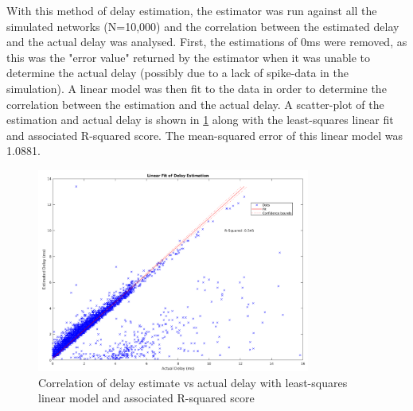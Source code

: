 With this method of delay estimation, the estimator was run against all the simulated networks (N=10,000) and the correlation between the estimated delay and the actual delay was analysed. First, the estimations of 0ms were removed, as this was the "error value" returned by the estimator when it was unable to determine the actual delay (possibly due to a lack of spike-data in the simulation). A linear model was then fit to the data in order to determine the correlation between the estimation and the actual delay. A scatter-plot of the estimation and actual delay is shown in \ref{fig:2CellDelayLFit} along with the least-squares linear fit and associated R-squared score. The mean-squared error of this linear model was 1.0881.
\begin{figure}[ht]
    \centering
    \includegraphics[width=0.8\textwidth]{05-Results/delayFit.png}
    \caption{Correlation of delay estimate vs actual delay with least-squares linear model and associated R-squared score}
    \label{fig:2CellDelayLFit}
\end{figure}

